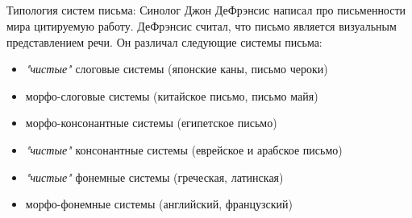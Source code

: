 \subsection{\citep{defrancis89}}
\begin{frame}{Типология систем письма: \citep{defrancis89}}
Синолог Джон ДеФрэнсис написал про письменности мира цитируемую работу. ДеФрэнсис считал, что письмо является визуальным представлением речи. Он различал следующие системы письма:
\begin{itemize}
\item \textit{"чистые"} слоговые системы (японские каны, письмо чероки)
\item морфо-слоговые системы (китайское письмо, письмо майя)
\item морфо-консонантные системы (египетское письмо)
\item \textit{"чистые"} консонантные системы (еврейское и арабское письмо)
\item \textit{"чистые"} фонемные системы (греческая, латинская)
\item морфо-фонемные системы (английский, французский)
\end{itemize}
\end{frame}
